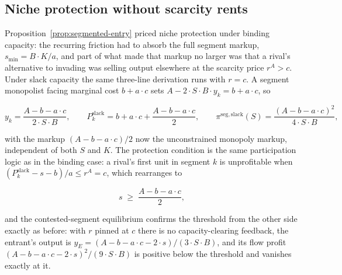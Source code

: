 \documentclass[11pt]{article}
\begin{document}
\subsection{Niche protection without scarcity rents}
\label{subsec:slack-niches}

Proposition~\ref{prop:segmented-entry} priced niche protection under binding capacity: the recurring friction had to absorb the full segment markup, $s_{\min}=B\cdot K/a$, and part of what made that markup no larger was that a rival's alternative to invading was selling output elsewhere at the scarcity price $r^{A}>c$. Under slack capacity the same three-line derivation runs with $r=c$. A segment monopolist facing marginal cost $b+a\cdot c$ sets $A-2\cdot S\cdot B\cdot y_k=b+a\cdot c$, so

\begin{equation}y_k=\frac{A-b-a\cdot c}{2\cdot S\cdot B},\qquad P_k^{\mathrm{slack}}=b+a\cdot c+\frac{A-b-a\cdot c}{2},\qquad \pi^{\mathrm{seg,slack}}(S)=\frac{(A-b-a\cdot c)^{2}}{4\cdot S\cdot B},\end{equation}

with the markup $(A-b-a\cdot c)/2$ now the unconstrained monopoly markup, independent of both $S$ and $K$. The protection condition is the same participation logic as in the binding case: a rival's first unit in segment $k$ is unprofitable when $(P_k^{\mathrm{slack}}-s-b)/a\leq r^{A}=c$, which rearranges to

\begin{equation}s\;\geq\;\frac{A-b-a\cdot c}{2},\end{equation}

and the contested-segment equilibrium confirms the threshold from the other side exactly as before: with $r$ pinned at $c$ there is no capacity-clearing feedback, the entrant's output is $y_E=(A-b-a\cdot c-2\cdot s)/(3\cdot S\cdot B)$, and its flow profit $(A-b-a\cdot c-2\cdot s)^{2}/(9\cdot S\cdot B)$ is positive below the threshold and vanishes exactly at it.
\end{document}
